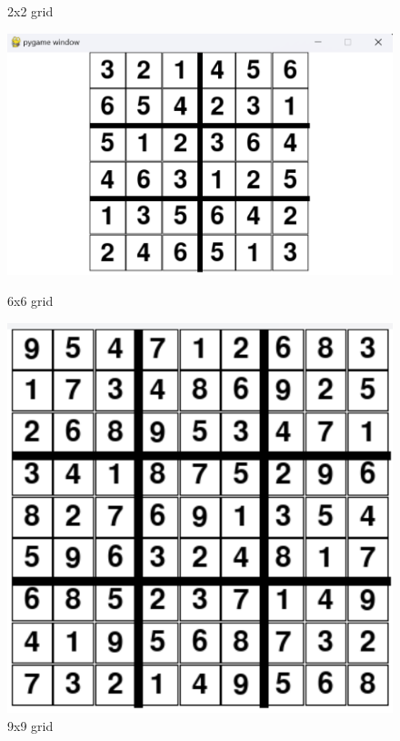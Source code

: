 \documentclass[]{final_report}
\begin{document}
\begin{figure}[ht]
\begin{minipage}{0.3\textwidth}
        \caption{2x2 grid} 
        \label{fig:solved 2x2} 
    \end{minipage} 
    \hfill 
    \begin{minipage}{0.3\textwidth} 
        \includegraphics[width=\textwidth]{images/6x6 solved.png} 
        \caption{6x6 grid} 
        \label{fig:solved 6x6} 
    \end{minipage} 
    \hfill 
    \begin{minipage}{0.3\textwidth} 
        \includegraphics[width=\textwidth]{images/9x9 solved.png} 
        \caption{9x9 grid} 
        \label{fig:solved 9x9} 
    \end{minipage}
\end{figure}
\end{document}
